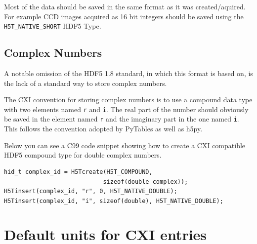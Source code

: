 \documentclass[usletter,11pt]{article}
\begin{document}
Most of the data should be saved in the same format as it was
created/aquired. For example CCD images acquired as 16 bit integers
should be saved using the {\tt H5T\_NATIVE\_SHORT} HDF5 Type.

\subsection{Complex Numbers}

A notable omission of the HDF5 1.8 standard, in which this format is
based on, is the lack of a standard way to store complex numbers.

The CXI convention for storing complex numbers is to use a compound data
type with two elements named {\tt r} and {\tt i}. The real part of the
number should obviously be saved in the element named {\tt r} and the imaginary
part in the one named {\tt i}. This follows the convention adopted by
PyTables as well as h5py.

Below you can see a C99 code snippet showing how to create a CXI compatible HDF5
compound type for double complex numbers.

\begin{lstlisting}
hid_t complex_id = H5Tcreate(H5T_COMPOUND, 
                            sizeof(double complex));
H5Tinsert(complex_id, "r", 0, H5T_NATIVE_DOUBLE);
H5Tinsert(complex_id, "i", sizeof(double), H5T_NATIVE_DOUBLE);
\end{lstlisting}

\clearpage
\section{Default units for CXI entries}
\label{units}
\end{document}
